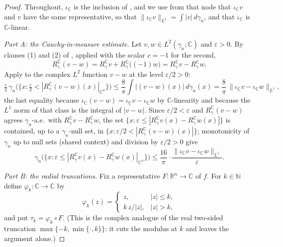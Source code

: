 \begin{proof}
Throughout, $\iota_{\mathbb{C}}$ is the inclusion of , and
we use from that node that $\iota_{\mathbb{C}} v$ and $v$ have the same
representative, so that $\|\iota_{\mathbb{C}} v\|_{L^1} = \int |v| \, d\gamma_n$,
and that $\iota_{\mathbb{C}}$ is $\mathbb{C}$-linear.

\emph{Part A: the Cauchy-in-measure estimate.}
Let $v, w \in L^2(\gamma_n;\mathbb{C})$ and $\varepsilon > 0$.  By clauses (1)
and (2) of , applied with the scalar
$c = -1$ for the second,
\[
  R_\gamma^{\mathbb{C}}(v - w)
    = R_\gamma^{\mathbb{C}} v + R_\gamma^{\mathbb{C}}\bigl((-1)w\bigr)
    = R_\gamma^{\mathbb{C}} v - R_\gamma^{\mathbb{C}} w .
\]
Apply  to the complex $L^2$ function $v - w$ at the
level $\varepsilon/2 > 0$:
\[
  \tfrac{\varepsilon}{2}\,
    \gamma_n\bigl(\{x : \tfrac{\varepsilon}{2}
      < |R_\gamma^{\mathbb{C}}(v-w)(x)|_{\mathbb{C}^n}\}\bigr)
    \leq \frac{8}{\pi}\int |(v-w)(x)| \, d\gamma_n(x)
    = \frac{8}{\pi}\,\|\iota_{\mathbb{C}} v - \iota_{\mathbb{C}} w\|_{L^1} ,
\]
the last equality because $\iota_{\mathbb{C}}(v-w)
 = \iota_{\mathbb{C}} v - \iota_{\mathbb{C}} w$ by $\mathbb{C}$-linearity and
because the $L^1$ norm of that class is the integral of $|v-w|$.  Since
$\varepsilon/2 < \varepsilon$ and $R_\gamma^{\mathbb{C}}(v-w)$ agrees
$\gamma_n$-a.e.\ with $R_\gamma^{\mathbb{C}} v - R_\gamma^{\mathbb{C}} w$, the
set $\{x : \varepsilon \leq |R_\gamma^{\mathbb{C}} v(x)
 - R_\gamma^{\mathbb{C}} w(x)|\}$ is contained, up to a $\gamma_n$-null set, in
$\{x : \varepsilon/2 < |R_\gamma^{\mathbb{C}}(v-w)(x)|\}$; monotonicity of
$\gamma_n$ up to null sets (shared context) and division by $\varepsilon/2 > 0$
give
\begin{equation*}
  \gamma_n\bigl(\{x : \varepsilon \leq |R_\gamma^{\mathbb{C}} v(x)
      - R_\gamma^{\mathbb{C}} w(x)|_{\mathbb{C}^n}\}\bigr)
    \leq \frac{16}{\pi}\cdot
      \frac{\|\iota_{\mathbb{C}} v - \iota_{\mathbb{C}} w\|_{L^1}}{\varepsilon} .
  \tag{A}
\end{equation*}

\emph{Part B: the radial truncations.}
Fix a representative $F : \mathbb{R}^n \to \mathbb{C}$ of $f$.  For
$k \in \mathbb{N}$ define $\varphi_k : \mathbb{C} \to \mathbb{C}$ by
\[
  \varphi_k(z) = \begin{cases} z, & |z| \leq k, \\[2pt]
    k\,z/|z|, & |z| > k, \end{cases}
\]
and put $\tau_k = \varphi_k \circ F$.  (This is the complex analogue of the real
two-sided truncation $\max\{-k,\min\{\cdot,k\}\}$: it cuts the modulus at $k$ and
leaves the argument alone.)


\end{proof}
